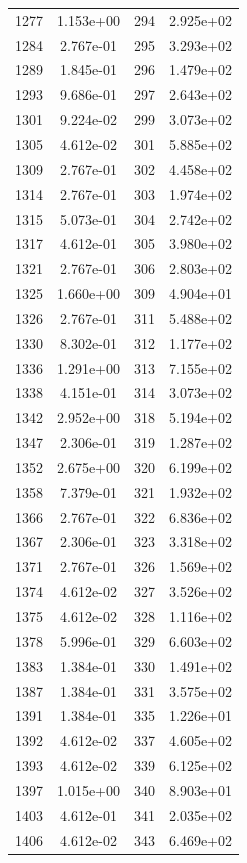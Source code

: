 \documentclass[12pt]{article}
\begin{document}
\begin{longtable}{@{}cccc@{}}
1277 & 1.153e+00 & 294 & 2.925e+02 \\
1284 & 2.767e-01 & 295 & 3.293e+02 \\
1289 & 1.845e-01 & 296 & 1.479e+02 \\
1293 & 9.686e-01 & 297 & 2.643e+02 \\
1301 & 9.224e-02 & 299 & 3.073e+02 \\
1305 & 4.612e-02 & 301 & 5.885e+02 \\
1309 & 2.767e-01 & 302 & 4.458e+02 \\
1314 & 2.767e-01 & 303 & 1.974e+02 \\
1315 & 5.073e-01 & 304 & 2.742e+02 \\
1317 & 4.612e-01 & 305 & 3.980e+02 \\
1321 & 2.767e-01 & 306 & 2.803e+02 \\
1325 & 1.660e+00 & 309 & 4.904e+01 \\
1326 & 2.767e-01 & 311 & 5.488e+02 \\
1330 & 8.302e-01 & 312 & 1.177e+02 \\
1336 & 1.291e+00 & 313 & 7.155e+02 \\
1338 & 4.151e-01 & 314 & 3.073e+02 \\
1342 & 2.952e+00 & 318 & 5.194e+02 \\
1347 & 2.306e-01 & 319 & 1.287e+02 \\
1352 & 2.675e+00 & 320 & 6.199e+02 \\
1358 & 7.379e-01 & 321 & 1.932e+02 \\
1366 & 2.767e-01 & 322 & 6.836e+02 \\
1367 & 2.306e-01 & 323 & 3.318e+02 \\
1371 & 2.767e-01 & 326 & 1.569e+02 \\
1374 & 4.612e-02 & 327 & 3.526e+02 \\
1375 & 4.612e-02 & 328 & 1.116e+02 \\
1378 & 5.996e-01 & 329 & 6.603e+02 \\
1383 & 1.384e-01 & 330 & 1.491e+02 \\
1387 & 1.384e-01 & 331 & 3.575e+02 \\
1391 & 1.384e-01 & 335 & 1.226e+01 \\
1392 & 4.612e-02 & 337 & 4.605e+02 \\
1393 & 4.612e-02 & 339 & 6.125e+02 \\
1397 & 1.015e+00 & 340 & 8.903e+01 \\
1403 & 4.612e-01 & 341 & 2.035e+02 \\
1406 & 4.612e-02 & 343 & 6.469e+02 \\

\end{longtable}
\end{document}
